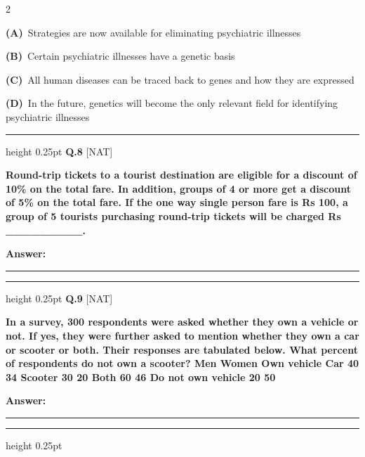 \documentclass[a4paper,10pt,twoside]{article}
\begin{document}
\begin{multicols}{2}
\par\vspace{2pt}\noindent
\textbf{(A)}~Strategies are now available for eliminating psychiatric illnesses\par\vspace{2pt}\noindent
\textbf{(B)}~Certain psychiatric illnesses have a genetic basis\par\vspace{2pt}\noindent
\textbf{(C)}~All human diseases can be traced back to genes and how they are expressed\par\vspace{2pt}\noindent
\textbf{(D)}~In the future, genetics will become the only relevant field for identifying psychiatric illnesses
\par\vspace{6pt}\hrule height 0.25pt\vspace{6pt}
\noindent\textbf{Q.8} \hfill {\footnotesize\textsf{[NAT]}}
\par\vspace{2pt}
{\bfseries Round-trip tickets to a tourist destination are eligible for a discount of 10\% on the total fare. In
addition, groups of 4 or more get a discount of 5\% on the total fare. If the one way single person
fare is Rs 100, a group of 5 tourists purchasing round-trip tickets will be charged Rs \_\_\_\_\_\_\_\_\_. \par}
\par\vspace{3pt}\noindent\textbf{Answer:} \rule{3.2cm}{0.4pt}
\par\vspace{6pt}\hrule height 0.25pt\vspace{6pt}
\noindent\textbf{Q.9} \hfill {\footnotesize\textsf{[NAT]}}
\par\vspace{2pt}
{\bfseries In a survey, 300 respondents were asked whether they own a vehicle or not. If yes, they were
further asked to mention whether they own a car or scooter or both. Their responses are tabulated
below. What percent of respondents do not own a scooter?
Men
Women
Own vehicle
Car
40
34
Scooter
30
20
Both
60
46
Do not own vehicle
20
50 \par}
\par\vspace{3pt}\noindent\textbf{Answer:} \rule{3.2cm}{0.4pt}
\par\vspace{6pt}\hrule height 0.25pt\vspace{6pt}

\end{multicols}
\end{document}
